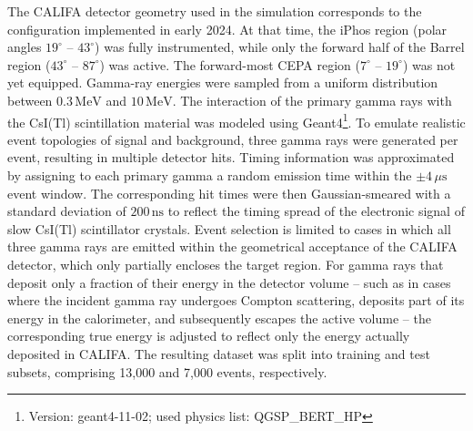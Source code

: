 \documentclass[review,sort&compress]{elsarticle}
\begin{document}
The CALIFA detector geometry used in the simulation corresponds to the configuration implemented in early 2024. At that time, the iPhos region (polar angles $19^\circ$ -- $43^\circ$) was fully instrumented, while only the forward half of the Barrel region ($43^\circ$ -- $87^\circ$) was active. The forward-most CEPA region ($7^\circ$ -- $19^\circ$) was not yet equipped.\newline
Gamma-ray energies were sampled from a uniform distribution between $0.3\,\mathrm{MeV}$ and $10\,\mathrm{MeV}$. The interaction of the primary gamma rays with the CsI(Tl) scintillation material was modeled using Geant4\footnote{Version: geant4-11-02; used physics list: QGSP\_BERT\_HP}.\newline
To emulate realistic event topologies of signal and background, three gamma rays were generated per event, resulting in multiple detector hits. Timing information was approximated by assigning to each primary gamma a random emission time within the $\pm 4\,\mu\mathrm{s}$ event window. The corresponding hit times were then Gaussian-smeared with a standard deviation of $200\,\mathrm{ns}$ to reflect the timing spread of the electronic signal of slow CsI(Tl) scintillator crystals.\newline
Event selection is limited to cases in which all three gamma rays are emitted within the geometrical acceptance of the CALIFA detector, which only partially encloses the target region. For gamma rays that deposit only a fraction of their energy in the detector volume -- such as in cases where the incident gamma ray undergoes Compton scattering, deposits part of its energy in the calorimeter, and subsequently escapes the active volume -- the corresponding true energy is adjusted to reflect only the energy actually deposited in CALIFA.\newline
The resulting dataset was split into training and test subsets, comprising 13{,}000 and 7{,}000 events, respectively.
\end{document}
